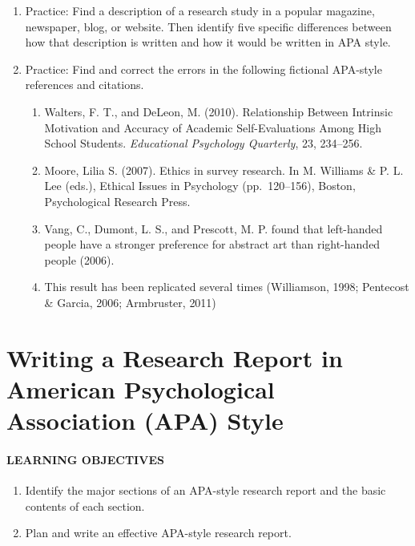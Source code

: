 \documentclass[
]{krantz}
\providecommand{\tightlist}{%
  \setlength{\itemsep}{0pt}\setlength{\parskip}{0pt}}
\begin{document}
\begin{enumerate}
\def\labelenumi{\arabic{enumi}.}
\tightlist
\item
  Practice: Find a description of a research study in a popular magazine, newspaper, blog, or website. Then identify five specific differences between how that description is written and how it would be written in APA style.
\item
  Practice: Find and correct the errors in the following fictional APA-style references and citations.

  \begin{enumerate}
  \def\labelenumii{\alph{enumii}.}
  \tightlist
  \item
    Walters, F. T., and DeLeon, M. (2010). Relationship Between Intrinsic Motivation and Accuracy of Academic Self-Evaluations Among High School Students. \emph{Educational Psychology Quarterly}, 23, 234--256.
  \item
    Moore, Lilia S. (2007). Ethics in survey research. In M. Williams \& P. L. Lee (eds.), Ethical Issues in Psychology (pp.~120--156), Boston, Psychological Research Press.
  \item
    Vang, C., Dumont, L. S., and Prescott, M. P. found that left-handed people have a stronger preference for abstract art than right-handed people (2006).
  \item
    This result has been replicated several times (Williamson, 1998; Pentecost \& Garcia, 2006; Armbruster, 2011)
  \end{enumerate}
\end{enumerate}

\hypertarget{writing-a-research-report-in-american-psychological-association-apa-style}{%
\section{Writing a Research Report in American Psychological Association (APA) Style}\label{writing-a-research-report-in-american-psychological-association-apa-style}}

\hypertarget{learning-objectives-33}{%
\paragraph*{LEARNING OBJECTIVES}\label{learning-objectives-33}}

\begin{enumerate}
\def\labelenumi{\arabic{enumi}.}
\tightlist
\item
  Identify the major sections of an APA-style research report and the basic contents of each section.
\item
  Plan and write an effective APA-style research report.
\end{enumerate}
\end{document}
